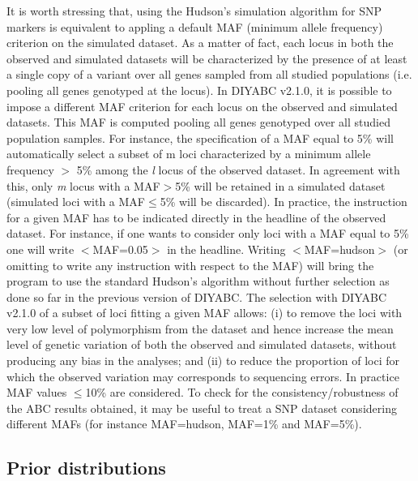 It is worth stressing that, using the Hudson\textquoteright{}s simulation
algorithm for SNP markers is equivalent to appling a default MAF (minimum
allele frequency) criterion on the simulated dataset. As a matter
of fact, each locus in both the observed and simulated datasets will
be characterized by the presence of at least a single copy of a variant
over all genes sampled from all studied populations (i.e. pooling
all genes genotyped at the locus). In DIYABC v2.1.0, it is possible
to impose a different MAF criterion for each locus on the observed
and simulated datasets. This MAF is computed pooling all genes genotyped
over all studied population samples. For instance, the specification
of a MAF equal to 5\% will automatically select a subset of m loci
characterized by a minimum allele frequency $>$ 5\% among the \textit{l}
locus of the observed dataset. In agreement with this, only \textit{m}
locus with a MAF$>$5\% will be retained in a simulated dataset (simulated
loci with a MAF\ensuremath{\le}5\% will be discarded). In practice,
the instruction for a given MAF has to be indicated directly in the
headline of the observed dataset. For instance, if one wants to consider
only loci with a MAF equal to 5\% one will write\textsf{ $<$MAF=0.05$>$
}in the headline. Writing \textsf{$<$MAF=hudson$>$} (or omitting to write
any instruction with respect to the MAF) will bring the program to
use the standard Hudson\textquoteright{}s algorithm without further
selection as done so far in the previous version of DIYABC. The selection
with DIYABC v2.1.0 of a subset of loci fitting a given MAF allows:
(i) to remove the loci with very low level of polymorphism from the
dataset and hence increase the mean level of genetic variation of
both the observed and simulated datasets, without producing any bias
in the analyses; and (ii) to reduce the proportion of loci for which
the observed variation may corresponds to sequencing errors. In practice
MAF values \ensuremath{\le}10\% are considered. To check for the consistency/robustness
of the ABC results obtained, it may be useful to treat a SNP dataset
considering different MAFs (for instance MAF=hudson, MAF=1\% and MAF=5\%).


\subsection{Prior distributions}

